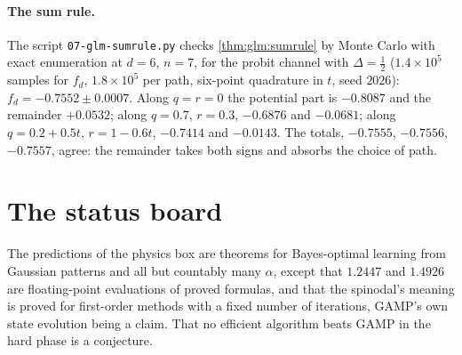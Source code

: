 \begin{refsection}
\paragraph{The sum rule.} The script \texttt{07-glm-sumrule.py} checks \cref{thm:glm:sumrule} by Monte Carlo with exact enumeration at $d=6$, $n=7$, for the probit channel with $\Delta=\frac12$ ($1.4\times10^5$ samples for $f_d$, $1.8\times10^5$ per path, six-point quadrature in $t$, seed $2026$): $f_d=-0.7552\pm0.0007$. Along $q=r=0$ the potential part is $-0.8087$ and the remainder $+0.0532$; along $q=0.7$, $r=0.3$, $-0.6876$ and $-0.0681$; along $q=0.2+0.5t$, $r=1-0.6t$, $-0.7414$ and $-0.0143$. The totals, $-0.7555$, $-0.7556$, $-0.7557$, agree: the remainder takes both signs and absorbs the choice of path.

\section{The status board}\label{sec:glm:status}

The predictions of the physics box are theorems for Bayes-optimal learning from Gaussian patterns and all but countably many $\alpha$, except that $1.2447$ and $1.4926$ are floating-point evaluations of proved formulas, and that the spinodal's meaning is proved for first-order methods with a fixed number of iterations, GAMP's own state evolution being a claim. That no efficient algorithm beats GAMP in the hard phase is a conjecture.


\end{refsection}
